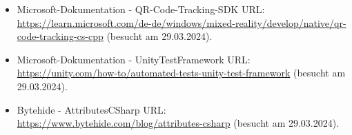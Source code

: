 \begin{itemize}[leftmargin=0pt]
    \item Microsoft-Dokumentation - QR-Code-Tracking-SDK {\scriptsize URL:} \url{https://learn.microsoft.com/de-de/windows/mixed-reality/develop/native/qr-code-tracking-cs-cpp} (besucht am 29.03.2024).
    \item Microsoft-Dokumentation - UnityTestFramework {\scriptsize URL:} \url{https://unity.com/how-to/automated-tests-unity-test-framework} (besucht am 29.03.2024).
    \item Bytehide - AttributesCSharp {\scriptsize URL:} \url{https://www.bytehide.com/blog/attributes-csharp} (besucht am 29.03.2024).
\end{itemize}